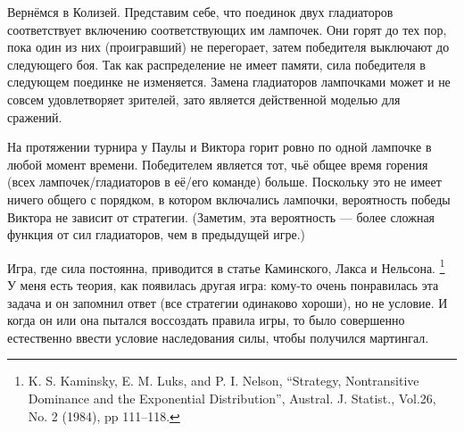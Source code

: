 Вернёмся в Колизей.
Представим себе, что поединок двух гладиаторов соответствует включению соответствующих им лампочек.
Они горят до тех пор, пока один из них (проигравший) не перегорает, затем победителя выключают до следующего боя.
Так как распределение не имеет памяти, сила победителя в следующем поединке не изменяется.
Замена гладиаторов лампочками может и не совсем удовлетворяет зрителей, зато является действенной моделью для сражений.

На протяжении турнира у Паулы и Виктора горит ровно по одной лампочке в любой момент времени.
Победителем является тот, чьё общее время горения (всех лампочек/гладиаторов в её/его команде) больше.
Поскольку это не имеет ничего общего с порядком, в котором включались лампочки, вероятность победы Виктора не зависит от стратегии.
(Заметим, эта вероятность --- более сложная функция от сил гладиаторов, чем в предыдущей игре.)
\heart

Игра, где сила постоянна, приводится в статье Каминского, Лакса и Нельсона.%
\footnote{K. S. Kaminsky, E. M. Luks, and P. I. Nelson, “Strategy, Nontransitive Dominance and the Exponential Distribution”, Austral. J. Statist., Vol.26, No. 2 (1984), pp 111--118.}
У меня есть теория, как появилась другая игра: кому-то очень понравилась эта задача и он запомнил ответ (все стратегии одинаково хороши), но не условие.
И когда он или она пытался воссоздать правила игры, то было совершенно естественно ввести условие наследования силы, чтобы получился мартингал.
